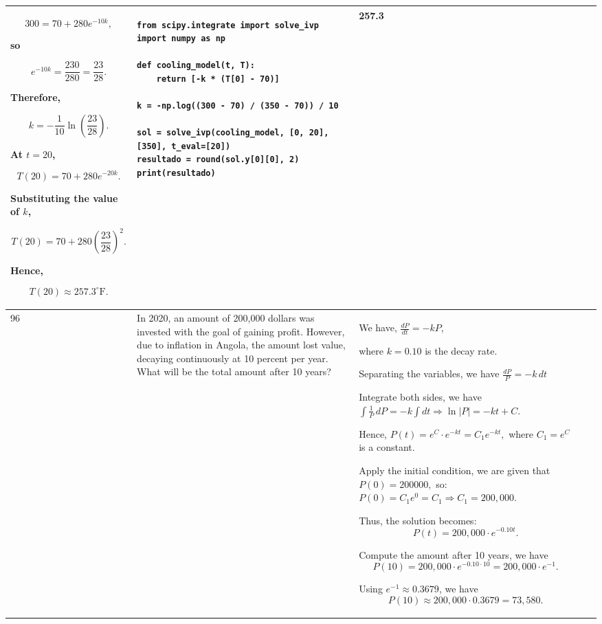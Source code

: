 \documentclass[a4paper,12pt]{article}
\begin{document}
\begin{longtable}{|p{0.3cm}|p{}|p{10cm}|p{}|p{1.5cm}|}
\[
300=70+280e^{-10k},
\]

so

\[
e^{-10k}=\frac{230}{280}=\frac{23}{28}.
\]

Therefore,

\[
k=-\frac{1}{10}\ln\left(\frac{23}{28}\right).
\]

At \(t=20\),

\[
T(20)=70+280e^{-20k}.
\]

Substituting the value of \(k\),

\[
T(20)
=70+280\left(\frac{23}{28}\right)^2.
\]

Hence,

\[
T(20)\approx257.3^\circ\mathrm{F}.
\] &
\begin{verbatim}
from scipy.integrate import solve_ivp
import numpy as np

def cooling_model(t, T):
    return [-k * (T[0] - 70)]

k = -np.log((300 - 70) / (350 - 70)) / 10

sol = solve_ivp(cooling_model, [0, 20], [350], t_eval=[20])
resultado = round(sol.y[0][0], 2)
print(resultado)
\end{verbatim}
& 257.3 \\ \hline

96 & In 2020, an amount of 200,000 dollars was invested with the goal of gaining profit. However, due to inflation in Angola, the amount lost value, decaying continuously at 10 percent per year. What will be the total amount after 10 years? &
We have,
$\frac{dP}{dt} = -kP$,

where $k = 0.10$ is the decay rate.

Separating the variables, we have
$\frac{dP}{P} = -k \, dt$

Integrate both sides, we have
$\int \frac{1}{P} \, dP = -k \int dt \Rightarrow \ln|P| = -kt + C.$

Hence,
$P(t) = e^{C} \cdot e^{-kt} = C_1 e^{-kt},$
where $C_1 = e^{C}$ is a constant.

Apply the initial condition,
we are given that $P(0) = 200000,$ so:
$P(0) = C_1 e^0 = C_1 \Rightarrow C_1 = 200{,}000.$

Thus, the solution becomes:
\[P(t) = 200{,}000 \cdot e^{-0.10t}.\]

Compute the amount after 10 years, we have
\[P(10) = 200{,}000 \cdot e^{-0.10 \cdot 10} = 200{,}000 \cdot e^{-1}.\]

Using $e^{-1} \approx 0.3679$, we have
\[P(10) \approx 200{,}000 \cdot 0.3679 = 73{,}580.\]


\end{longtable}
\end{document}
